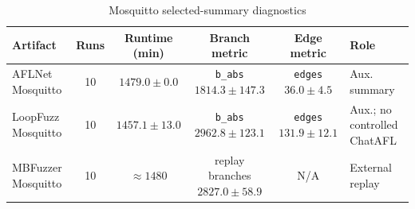 \documentclass[final,5p,times,number]{elsarticle}
\begin{document}
\begin{table}[!t]
\centering
\caption{Auxiliary state-exploration cross-artifact diagnostics (incomparable metric surfaces). \textbf{Different instrumentation; NOT directly comparable to AFLNet-lineage \texttt{b\_abs}/\texttt{edges}; Sec.~\ref{sec:lightftp_anomaly}.}}
\vspace{-0.15em}
\label{tab:aux_edge_artifact}
{\scriptsize
\setlength{\tabcolsep}{5.0pt}
\renewcommand{\arraystretch}{0.95}
}
\end{table}

\begin{table}[!t]
\centering
\caption{Mosquitto selected-summary diagnostics}
\label{tab:mqtt_artifact_integrity}
{\scriptsize
\setlength{\tabcolsep}{4.0pt}
\renewcommand{\arraystretch}{0.96}
\begin{tabular}{@{}l c c c c l@{}}
\toprule
Artifact & Runs & Runtime (min) & Branch metric & Edge metric & Role \\
\midrule
AFLNet Mosquitto & 10 & $1479.0 {\pm} 0.0$ & \texttt{b\_abs} $1814.3 {\pm} 147.3$ & \texttt{edges} $36.0 {\pm} 4.5$ & Aux. summary \\
LoopFuzz Mosquitto & 10 & $1457.1 {\pm} 13.0$ & \texttt{b\_abs} $2962.8 {\pm} 123.1$ & \texttt{edges} $131.9 {\pm} 12.1$ & Aux.; no controlled ChatAFL \\
MBFuzzer Mosquitto & 10 & $\approx 1480$ & replay branches $2827.0 {\pm} 58.9$ & N/A & External replay \\
\bottomrule
\end{tabular}
}
\end{table}
\end{document}
